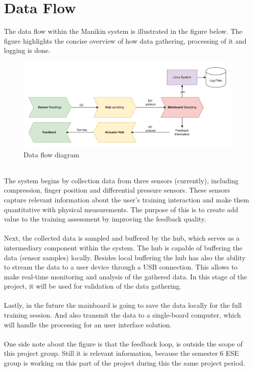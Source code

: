 \section {Data Flow}
The data flow within the Manikin system is illustrated in the figure below. The figure highlights the concise overview of how data gathering, processing of it and logging is done. 
\begin{figure}[h!]
 \includegraphics[scale=0.075]{figures/System Dataflow overview.jpg}
 \caption{Data flow diagram}
\end{figure}\\
The system begins by collection data from three sensors (currently), including compression, finger position and differential pressure sensors. These sensors capture relevant information about the user's training interaction and make them quantitative with physical measurements. The purpose of this is to create add value to the training assessment by improving the feedback quality. \\\\
Next, the collected data is sampled and buffered by the hub, which serves as a intermediary component within the system. The hub is capable of buffering the data (sensor samples) locally. Besides local buffering the hub has also the ability to stream the data to a user device through a USB connection. This allows to make real-time monitoring and analysis of the gathered data. In this stage of the project, it will be used for validation of the data gathering.\\\\
Lastly, in the future the mainboard is going to save the data locally for the full training session. And also transmit the data to a single-board computer, which will handle the processing for an user interface solution. 
\\\\
One side note about the figure is that the feedback loop, is outside the scope of this project group. Still it is relevant information, because the semester 6 ESE group is working on this part of the project during this the same project period.  
